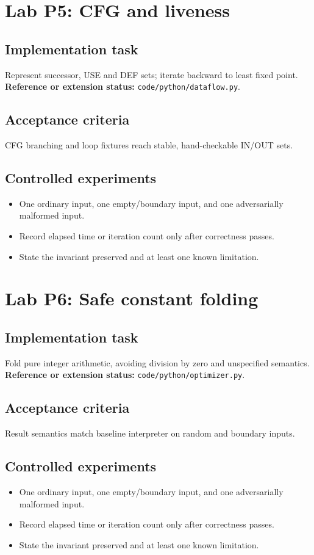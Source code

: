 \documentclass[10pt,letterpaper]{article}
\begin{document}
\section{Lab P5: CFG and liveness}
\subsection{Implementation task}
Represent successor, USE and DEF sets; iterate backward to least fixed point.
\textbf{Reference or extension status:} \nolinkurl{code/python/dataflow.py}.\par\subsection{Acceptance criteria}
CFG branching and loop fixtures reach stable, hand-checkable IN/OUT sets.
\subsection{Controlled experiments}
\begin{itemize}
\item One ordinary input, one empty/boundary input, and one adversarially malformed input.
\item Record elapsed time or iteration count only after correctness passes.
\item State the invariant preserved and at least one known limitation.
\end{itemize}


\section{Lab P6: Safe constant folding}
\subsection{Implementation task}
Fold pure integer arithmetic, avoiding division by zero and unspecified semantics.
\textbf{Reference or extension status:} \nolinkurl{code/python/optimizer.py}.\par\subsection{Acceptance criteria}
Result semantics match baseline interpreter on random and boundary inputs.
\subsection{Controlled experiments}
\begin{itemize}
\item One ordinary input, one empty/boundary input, and one adversarially malformed input.
\item Record elapsed time or iteration count only after correctness passes.
\item State the invariant preserved and at least one known limitation.
\end{itemize}
\end{document}
